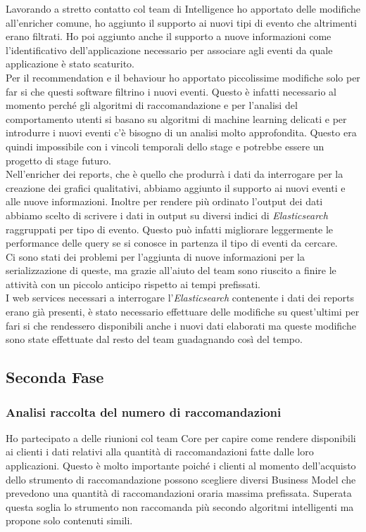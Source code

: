 \documentclass[a4paper, 12pt, twoside, openright]{book}
\begin{document}
Lavorando a stretto contatto col team di Intelligence ho apportato delle modifiche all'enricher comune, ho aggiunto il supporto ai nuovi tipi di evento che altrimenti erano filtrati. Ho poi aggiunto anche il supporto a nuove informazioni come l'identificativo dell'applicazione necessario per associare agli eventi da quale applicazione è stato scaturito.\\
Per il recommendation e il behaviour ho apportato piccolissime modifiche solo per far si che questi software filtrino i nuovi eventi. Questo è infatti necessario al momento perché gli algoritmi di raccomandazione e per l'analisi del comportamento utenti si basano su algoritmi di machine learning delicati e per introdurre i nuovi eventi c'è bisogno di un analisi molto approfondita. Questo era quindi impossibile con i vincoli temporali dello stage e potrebbe essere un progetto di stage futuro.\\
Nell'enricher dei reports, che è quello che produrrà i dati da interrogare per la creazione dei grafici qualitativi, abbiamo aggiunto il supporto ai nuovi eventi e alle nuove informazioni. Inoltre per rendere più ordinato l'output dei dati abbiamo scelto di scrivere i dati in output su diversi indici di \textit{Elasticsearch} raggruppati per tipo di evento. Questo può infatti migliorare leggermente le performance delle query se si conosce in partenza il tipo di eventi da cercare.\\

Ci sono stati dei problemi per l'aggiunta di nuove informazioni per la serializzazione di queste, ma grazie all'aiuto del team sono riuscito a finire le attività con un piccolo anticipo rispetto ai tempi prefissati.\\
I web services necessari a interrogare l'\textit{Elasticsearch} contenente i dati dei reports erano già presenti, è stato necessario effettuare delle modifiche su quest'ultimi per fari si che rendessero disponibili anche i nuovi dati elaborati ma queste modifiche sono state effettuate dal resto del team guadagnando così del tempo.\\

\subsection{Seconda Fase}

\subsubsection{Analisi raccolta del numero di raccomandazioni}
Ho partecipato a delle riunioni col team Core per capire come rendere disponibili ai clienti i dati relativi alla quantità di raccomandazioni fatte dalle loro applicazioni. Questo è molto importante poiché i clienti al momento dell'acquisto dello strumento di raccomandazione possono scegliere diversi Business Model che prevedono una quantità di raccomandazioni oraria massima prefissata. Superata questa soglia lo strumento non raccomanda più secondo algoritmi intelligenti ma propone solo contenuti simili.\\
\end{document}
